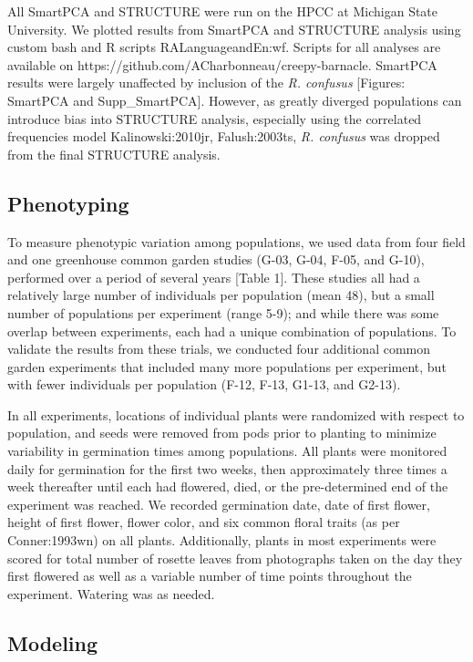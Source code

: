 \documentclass[twocolumn]{bmcart}%
\begin{document}
All SmartPCA and STRUCTURE were run on the HPCC at Michigan State University. We plotted results from SmartPCA and STRUCTURE analysis using custom bash and R scripts {RALanguageandEn:wf}. Scripts for all analyses are available on {https://github.com/ACharbonneau/creepy-barnacle}. SmartPCA results were largely unaffected by inclusion of the \textit{R. confusus} [Figures: SmartPCA and Supp\_SmartPCA]. However, as greatly diverged populations can introduce bias into STRUCTURE analysis, especially using the correlated frequencies model {Kalinowski:2010jr, Falush:2003ts}, \textit{R. confusus} was dropped from the final STRUCTURE analysis.

\subsection*{Phenotyping}

To measure phenotypic variation among populations, we used data from four field and one greenhouse common garden studies (G-03, G-04, F-05, and G-10), performed over a period of several years [Table 1]. These studies all had a relatively large number of individuals per population (mean 48), but a small number of populations per experiment (range 5-9); and while there was some overlap between experiments, each had a unique combination of populations. To validate the results from these trials, we conducted four additional common garden experiments that included many more populations per experiment, but with fewer individuals per population (F-12, F-13, G1-13, and G2-13).

In all experiments, locations of individual plants were randomized with respect to population, and seeds were removed from pods prior to planting to minimize variability in germination times among populations. All plants were monitored daily for germination for the first two weeks, then approximately three times a week thereafter until each had flowered, died, or the pre-determined end of the experiment was reached. We recorded germination date, date of first flower, height of first flower, flower color, and six common floral traits (as per {Conner:1993wn}) on all plants. Additionally, plants in most experiments were scored for total number of rosette leaves from photographs taken on the day they first flowered as well as a variable number of time points throughout the experiment. Watering was as needed.

\subsection*{Modeling}
\end{document}
